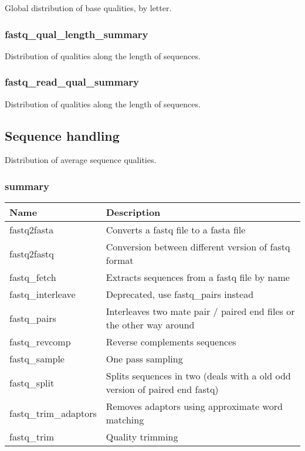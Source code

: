 \documentclass[a4paper,12pt]{article}
\begin{document}
Global distribution of base qualities, by letter.

\subsubsection{fastq\_qual\_length\_summary}

Distribution of qualities along the length of sequences.

\subsubsection{fastq\_read\_qual\_summary}

Distribution of qualities along the length of sequences.

\subsection{Sequence handling}

Distribution of average sequence qualities.

\subsubsection{summary}

\begin{tabularx}{\textwidth}{|X|X|}
    \hline
    \textbf{Name}                   & \textbf{Description} \\
    \hline
    \hline
    fastq2fasta                     & Converts a fastq file to a fasta file \\
    fastq2fastq                     & Conversion between different version of fastq format \\
    fastq\_fetch                    & Extracts sequences from a fastq file by name \\
    fastq\_interleave               & Deprecated, use fastq\_pairs instead \\
    fastq\_pairs                    & Interleaves two mate pair / paired end files or the other way around \\
    fastq\_revcomp                  & Reverse complements sequences \\
    fastq\_sample                   & One pass sampling \\
    fastq\_split                    & Splits sequences in two (deals with a old odd version of paired end fastq) \\
    fastq\_trim\_adaptors           & Removes adaptors using approximate word matching \\
    fastq\_trim                     & Quality trimming \\
    \hline
\end{tabularx}
\end{document}
